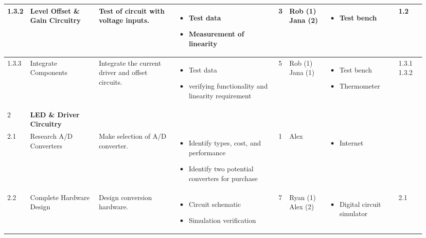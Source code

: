 \begin{table}
\begin{tabular}{|m{1cm}|m{1cm}|m{1cm}|m{1cm}|m{1cm}|m{1cm}|m{1cm}|m{1cm}|   }
1.3.2 & Level Offset \& Gain Circuitry & Test of circuit with voltage inputs. & 
	\begin{itemize} \item Test data  \item Measurement of linearity \end{itemize}
	& 3 & Rob (1) Jana (2) & 
	\begin{itemize} \item Test bench \end{itemize} & 1.2 \\ \hline

1.3.3 & Integrate Components & Integrate the current driver and offset circuits. & 
	\begin{itemize} \item Test data \item verifying functionality and linearity requirement \end{itemize} 
	&  5 & Rob (1) Jana (1) & 
	\begin{itemize} \item Test bench \item Thermometer \end{itemize} & 1.3.1 1.3.2 \\ \hline

2 & \textbf{LED \& Driver Circuitry} & & & & & & \\ \hline

2.1 & Research A/D Converters & Make selection of A/D converter. &
	\begin{itemize} \item Identify types, cost, and performance \item Identify two potential converters for purchase  \end{itemize}
	& 1 & Alex & \begin{itemize} \item Internet \end{itemize} & \\ \hline

2.2 & Complete Hardware Design  & Design conversion hardware. & 
	\begin{itemize} \item Circuit schematic \item Simulation verification \end{itemize}
	& 7 & Ryan (1) Alex (2) & 
	\begin{itemize} \item Digital circuit simulator \end{itemize} & 2.1 \\ \hline


\end{tabular}
\end{table}
